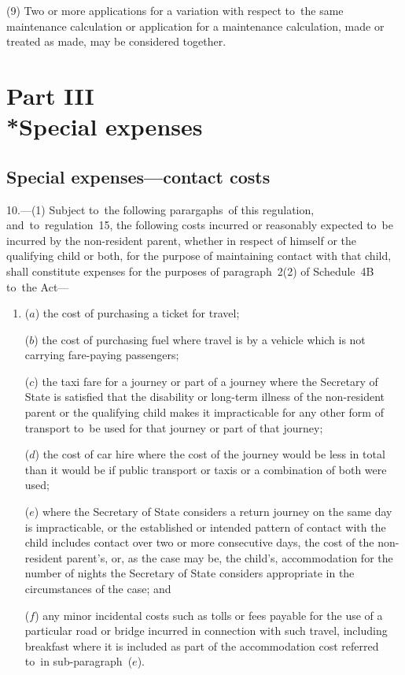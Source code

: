 \documentclass[12pt,a4paper]{article}
\begin{document}
(9) Two or more applications for a variation with respect to~the same maintenance calculation or application for a maintenance calculation, made or treated as made, may be considered together.


\section[Part III --- Special expenses]{Part III\\*Special expenses}

\subsection[10. Special expenses—contact costs]{Special expenses—contact costs}

\renewcommand\parthead{--- Part III}

10.---(1)  Subject to~the following parargaphs~of this regulation, and~to~regulation~15, the following costs incurred or reasonably expected to~be incurred by the non-resident parent, whether in respect of himself or the qualifying child or both, for the purpose of maintaining contact with that child, shall constitute expenses for the purposes of paragraph~2(2) of Schedule~4B to~the Act—
\begin{enumerate}\item[]
($a$) the cost of purchasing a ticket for travel;

($b$) the cost of purchasing fuel where travel is by a vehicle which is not carrying fare-paying passengers;

($c$) the taxi fare for a journey or part of a journey where the Secretary of State is satisfied that the disability or long-term illness of the non-resident parent or the qualifying child makes it impracticable for any other form of transport to~be used for that journey or part of that journey;

($d$) the cost of car hire where the cost of the journey would be less in total than it would be if public transport or taxis or a combination of both were used;

($e$) where the Secretary of State considers a return journey on the same day is impracticable, or the established or intended pattern of contact with the child includes contact over two or more consecutive days, the cost of the non-resident parent's, or, as the case may be, the child's, accommodation for the number of nights the Secretary of State considers appropriate in the circumstances of the case; and

($f$) any minor incidental costs such as tolls or fees payable for the use of a particular road or bridge incurred in connection with such travel, including breakfast where it is included as part of the accommodation cost referred to~in sub-paragraph~($e$).
\end{enumerate}
\end{document}
